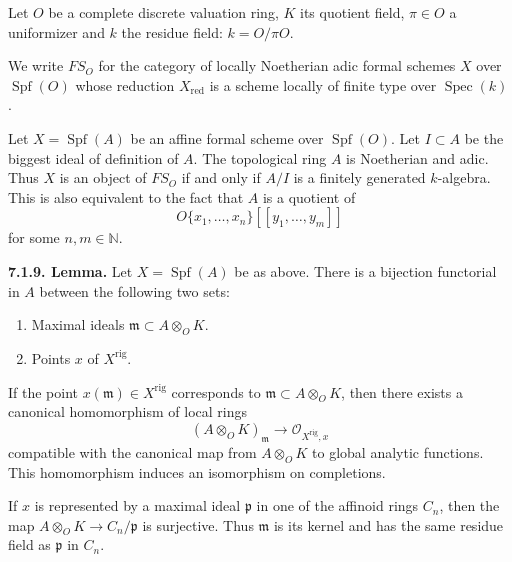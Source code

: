 

Let $O$ be a complete discrete valuation ring, $K$ its quotient field,
$\pi\in O$ a uniformizer and $k$ the residue field: $k=O/\pi O$.

We write $FS_O$ for the category of locally Noetherian adic formal schemes
$X$ over $\operatorname{Spf}(O)$ whose reduction $X_{\mathrm{red}}$ is a
scheme locally of finite type over $\operatorname{Spec}(k)$.

Let $X=\operatorname{Spf}(A)$ be an affine formal scheme over
$\operatorname{Spf}(O)$. Let $I\subset A$ be the biggest ideal of definition
of $A$. The topological ring $A$ is Noetherian and adic. Thus $X$ is an
object of $FS_O$ if and only if $A/I$ is a finitely generated $k$-algebra.
This is also equivalent to the fact that $A$ is a quotient of
\[
 O\{x_1,\ldots,x_n\}[[y_1,\ldots,y_m]]
\]
for some $n,m\in\mathbb N$.

\textbf{7.1.9. Lemma.} Let $X=\operatorname{Spf}(A)$ be as above. There is a
bijection functorial in $A$ between the following two sets:
\begin{enumerate}
\item Maximal ideals $\mathfrak m\subset A\otimes_O K$.
\item Points $x$ of $X^{\mathrm{rig}}$.
\end{enumerate}
If the point $x(\mathfrak m)\in X^{\mathrm{rig}}$ corresponds to
$\mathfrak m\subset A\otimes_O K$, then there exists a canonical
homomorphism of local rings
\[
 (A\otimes_O K)_{\mathfrak m}\longrightarrow
 \mathcal O_{X^{\mathrm{rig}},x}
\]
compatible with the canonical map from $A\otimes_O K$ to global analytic
functions. This homomorphism induces an isomorphism on completions.

If $x$ is represented by a maximal ideal $\mathfrak p$ in one of the
affinoid rings $C_n$, then the map $A\otimes_O K\to C_n/\mathfrak p$ is
surjective. Thus $\mathfrak m$ is its kernel and has the same residue field
as $\mathfrak p$ in $C_n$.



